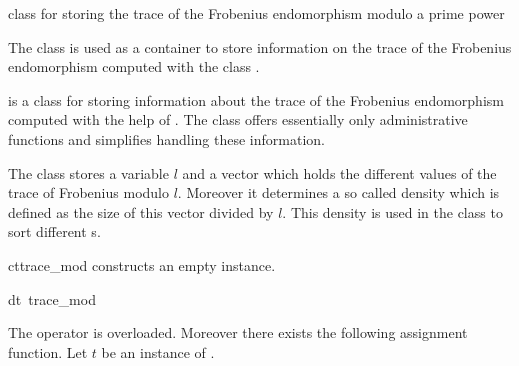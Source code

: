 

\NAME

 \dotfill class for storing the trace of the Frobenius endomorphism modulo a
prime power



\ABSTRACT

The class  is used as a container to store information on the trace of the
Frobenius endomorphism computed with the class .



\DESCRIPTION

 is a class for storing information about the trace of the Frobenius
endomorphism computed with the help of .  The class offers essentially only
administrative functions and simplifies handling these information.

The class stores a variable $l$ and a vector which holds the different values of the trace
of Frobenius modulo $l$.  Moreover it determines a so called density which is defined as
the size of this vector divided by $l$.  This density is used in the class
 to sort different s.



\CONS

\begin{fcode}{ct}{trace_mod}{}
  constructs an empty instance.
\end{fcode}

\begin{fcode}{dt}{~trace_mod}{}
\end{fcode}



\ASGN

The operator \code{=} is overloaded.  Moreover there exists the following assignment function.
Let $t$ be an instance of .

